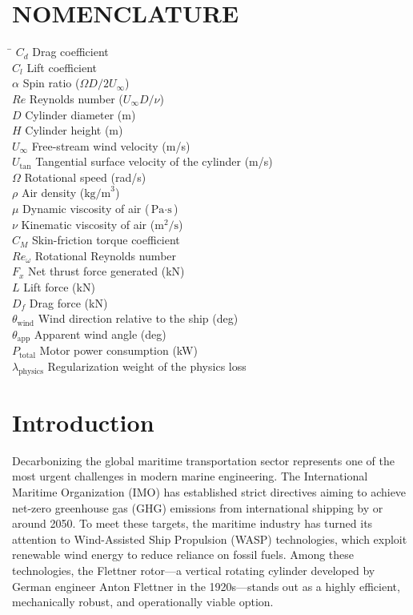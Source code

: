 \documentclass[aip,pof,reprint,onecolumn,amsmath,amssymb,graphicx,longbibliography]{revtex4-2}
\begin{document}
\section*{NOMENCLATURE}
\begin{tabbing}
\hspace*{3cm} \= \kill
$C_d$ \> Drag coefficient \\
$C_l$ \> Lift coefficient \\
$\alpha$ \> Spin ratio ($\Omega D / 2 U_{\infty}$) \\
$Re$ \> Reynolds number ($U_{\infty} D / \nu$) \\
$D$ \> Cylinder diameter (m) \\
$H$ \> Cylinder height (m) \\
$U_{\infty}$ \> Free-stream wind velocity (m/s) \\
$U_{\text{tan}}$ \> Tangential surface velocity of the cylinder (m/s) \\
$\Omega$ \> Rotational speed (rad/s) \\
$\rho$ \> Air density ($\text{kg/m}^3$) \\
$\mu$ \> Dynamic viscosity of air ($\text{Pa}\cdot\text{s}$) \\
$\nu$ \> Kinematic viscosity of air ($\text{m}^2/\text{s}$) \\
$C_M$ \> Skin-friction torque coefficient \\
$Re_{\omega}$ \> Rotational Reynolds number \\
$F_x$ \> Net thrust force generated (kN) \\
$L$ \> Lift force (kN) \\
$D_f$ \> Drag force (kN) \\
$\theta_{\text{wind}}$ \> Wind direction relative to the ship (deg) \\
$\theta_{\text{app}}$ \> Apparent wind angle (deg) \\
$P_{\text{total}}$ \> Motor power consumption (kW) \\
$\lambda_{\text{physics}}$ \> Regularization weight of the physics loss \\
\end{tabbing}


\section{\label{sec:intro}Introduction}
Decarbonizing the global maritime transportation sector represents one of the most urgent challenges in modern marine engineering. The International Maritime Organization (IMO) has established strict directives aiming to achieve net-zero greenhouse gas (GHG) emissions from international shipping by or around 2050. To meet these targets, the maritime industry has turned its attention to Wind-Assisted Ship Propulsion (WASP) technologies, which exploit renewable wind energy to reduce reliance on fossil fuels. Among these technologies, the Flettner rotor—a vertical rotating cylinder developed by German engineer Anton Flettner in the 1920s—stands out as a highly efficient, mechanically robust, and operationally viable option.
\end{document}

